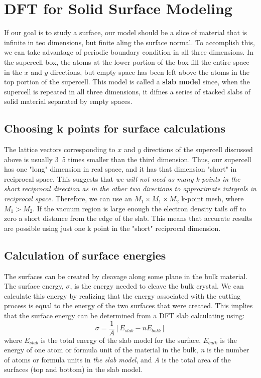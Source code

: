 \documentclass[12pt]{article}
\begin{document}
\section{DFT for Solid Surface Modeling}
If our goal is to study a surface, our model should be a slice of material that is infinite in teo dimensions, but finite aling the surface normal. To accomplish this, we can take advantage of periodic boundary condition in all three dimensions. In the supercell box, the atoms at the lower portion of the box fill the entire space in the $x$ and $y$ directions, but empty space has been left above the atoms in the top portion of the supercell. This model is called a \textbf{slab model} since, when the supercell is repeated in all three dimensions, it difnes a series of stacked slabs of solid material separated by empty spaces.
\subsection{Choosing k points for surface calculations}
The lattice vectors corresponding to $x$ and $y$ directions of the supercell discussed above is usually 3~5 times smaller than the third dimension. Thus, our supercell has one "long" dimension  in real space, and it has that dimension "short" in reciprocal space. This suggests that \emph{we will not need as many k points in the short reciprocal direction as in the other two directions to approximate intrgrals in reciprocal space.} Therefore, we can use an $M_1\times M_1 \times M_2$ k-point mesh, where $M_1>M_2$. If the vacuum region is large enough the electron density tails off to zero a short distance from the edge of the slab. This means that accurate results are possible using just one k point in the "short" reciprocal dimension.

\subsection{Calculation of surface energies}
The surfaces can be created by cleavage along some plane in the bulk material. The surface energy, $\sigma$, is the energy needed to cleave the bulk crystal. We can calculate this energy by realizing that the energy associated with the cutting process is equal to the energy of the two surfaces that were created. This implies that the surface energy can be determined from a DFT slab calculating using:
\begin{equation}
    \sigma=\frac{1}{A}[E_{slab}-nE_{bulk}]
\end{equation}
where $E_{slab}$ is the total energy of the slab model for the surface, $E_{bulk}$ is the energy of one atom or formula unit of the material in the bulk, \emph{n} is the number of atoms or formula units in \emph{the slab model}, and \emph{A} is the total area of the surfaces (top and bottom) in the slab model.
\end{document}
